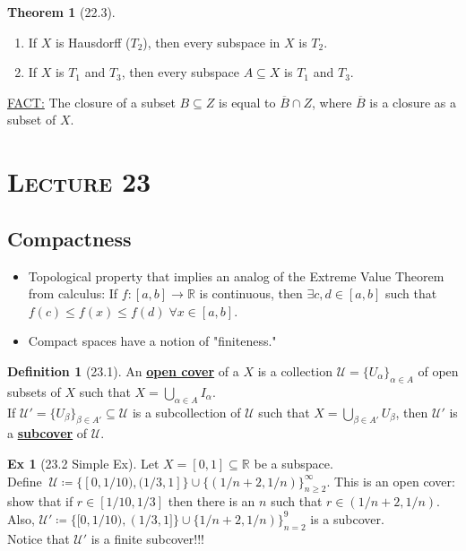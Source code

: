 \documentclass{article}
\newcommand{\R}{\ensuremath{\mathbb{R}}}
\newcommand{\script}[1]{\ensuremath{\mathscr{#1}}}
\newcommand{\coleq}{\ensuremath{\coloneqq}}
\newcommand{\define}[1]{\textbf{\underline{#1}}}
\newcommand{\func}[3]{\ensuremath{#1: #2 \to #3}}
\newcommand{\closure}[1]{\ensuremath{\overline{#1}}}
\newcommand{\Ts}[2]{\ensuremath{(#1,#2)}}
\newcommand{\union}{\cup}
\newcommand{\Union}{\bigcup}
\newcommand{\inter}{\cap}
\renewcommand{\Subset}{\subseteq}
\theoremstyle{definition}
\newtheorem*{defn}{Definition}
\newtheorem*{thm}{Theorem}
\newtheorem*{ex}{Ex}
\theoremstyle{remark}
\begin{document}
{{        \begin{thm}[22.3]\hfill
            \begin{enumerate}
                \item If $X$ is Hausdorff ($T_2$), then every subspace in $X$ is $T_2$.
                \item If $X$ is $T_1$ and $T_3$, then every subspace $A \Subset X$ is $T_1$ and $T_3$.
            \end{enumerate}
        \end{thm}
        }
        
        \noindent\underline{FACT:} The closure of a subset $B \Subset Z$ is equal to $\closure{B} \inter Z$, where $\closure{B}$ is a closure as a subset of $X$.
    }
    
    \noindent\section*{\textbf{\textsc{Lecture 23}}}{
        \subsection*{Compactness}{
            \begin{itemize}
                \item Topological property that implies an analog of the Extreme Value Theorem from calculus: If $\func{f}{[a,b]}{\R}$ is continuous, then $\exists c,d\in[a,b]$ such that $f(c)\leq f(x) \leq f(d) \; \forall x\in [a,b]$.
                \item Compact spaces have a notion of "finiteness." 
            \end{itemize}
        
            \begin{defn}[23.1]
                An \define{open cover} of a \Ts{} $X$ is a collection $\script{U}=\{U_\alpha\}_{\alpha \in A}$ of open subsets of $X$ such that $X=\Union_{\alpha \in A}  I_\alpha$.\\
                If $\script{U'}=\{U_\beta\}_{\beta \in A'} \Subset \script{U}$ is a subcollection of $\script{U}$ such that $X=\Union_{\beta \in A'}U_\beta$, then $\script{U'}$ is a \define{subcover} of $\script{U}$.
            \end{defn}
        
            \begin{ex}[23.2 Simple Ex]
                Let $X=[0,1] \Subset \R$ be a subspace.\\
                Define $\ \script{U}\coleq\{[0,1/10),(1/3,1]\} \union \{(1/n+2,1/n)\}_{n\geq 2}^\infty$. This is an open cover: show that if $r\in [1/10,1/3]$ then there is an $n$ such that $r \in (1/n+2,1/n)$.\\
                Also, $\script{U'}\coleq \{[0,1/10),(1/3,1]\} \union \{1/n+2,1/n)\}_{n=2}^9$ is a subcover.\\
                Notice that $\script{U'}$  is a finite subcover!!!
            \end{ex}
        
}}
\end{document}
